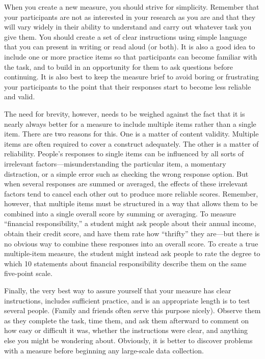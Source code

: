 \documentclass[]{book}
\theoremstyle{definition}
\theoremstyle{definition}
\theoremstyle{remark}
\begin{document}
When you create a new measure, you should strive for simplicity.
Remember that your participants are not as interested in your research
as you are and that they will vary widely in their ability to understand
and carry out whatever task you give them. You should create a set of
clear instructions using simple language that you can present in writing
or read aloud (or both). It is also a good idea to include one or more
practice items so that participants can become familiar with the task,
and to build in an opportunity for them to ask questions before
continuing. It is also best to keep the measure brief to avoid boring or
frustrating your participants to the point that their responses start to
become less reliable and valid.

The need for brevity, however, needs to be weighed against the fact that
it is nearly always better for a measure to include multiple items
rather than a single item. There are two reasons for this. One is a
matter of content validity. Multiple items are often required to cover a
construct adequately. The other is a matter of reliability. People's
responses to single items can be influenced by all sorts of irrelevant
factors---misunderstanding the particular item, a momentary distraction,
or a simple error such as checking the wrong response option. But when
several responses are summed or averaged, the effects of these
irrelevant factors tend to cancel each other out to produce more
reliable scores. Remember, however, that multiple items must be
structured in a way that allows them to be combined into a single
overall score by summing or averaging. To measure ``financial
responsibility,'' a student might ask people about their annual income,
obtain their credit score, and have them rate how ``thrifty'' they
are---but there is no obvious way to combine these responses into an
overall score. To create a true multiple-item measure, the student might
instead ask people to rate the degree to which 10 statements about
financial responsibility describe them on the same five-point scale.

Finally, the very best way to assure yourself that your measure has
clear instructions, includes sufficient practice, and is an appropriate
length is to test several people. (Family and friends often serve this
purpose nicely). Observe them as they complete the task, time them, and
ask them afterward to comment on how easy or difficult it was, whether
the instructions were clear, and anything else you might be wondering
about. Obviously, it is better to discover problems with a measure
before beginning any large-scale data collection.
\end{document}
